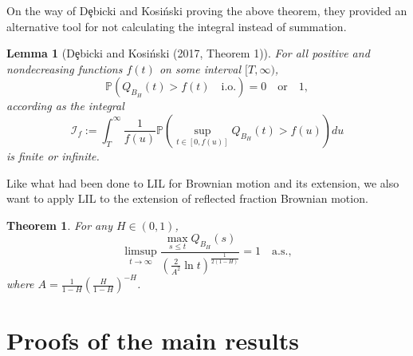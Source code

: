 \documentclass{article}
\newtheorem{thm}{\sc Theorem}
\newtheorem{lemma}{\sc Lemma}
\begin{document}
\begin{CJK*}{UTF8}{bsmi}
On the way of D{\c e}bicki and Kosi{\'n}ski proving the above theorem, they provided an alternative tool for not calculating the integral instead of summation.
\begin{lemma}[D{\c e}bicki and Kosi{\'n}ski (2017, Theorem 1)]
\label{integral}
For all positive and nondecreasing functions $f(t)$ on some interval $[T,\infty)$,
$$\mathbb{P}(Q_{B_{H}}(t)>f(t)\quad\mathrm{i.o.})=0\quad\mathrm{or}\quad1,$$
according as the integral
$$\mathcal{I}_f:=\int_T^\infty\frac{1}{f(u)}\mathbb{P}\left(\sup\limits_{t\in[0,f(u)]}Q_{B_{H}}(t)>f(u)\right)du$$
is finite or infinite.
\end{lemma}

Like what had been done to LIL for Brownian motion and its extension, we also want to apply LIL to the extension of reflected fraction Brownian motion.

\begin{thm}
\label{LIL_mrfbm}
    For any $H \in (0, 1)$,
    $$\limsup\limits_{t\rightarrow \infty} \frac{\max \limits_{s\leqslant t}Q_{B_{H}}(s)}{(\frac{2}{A^2}\ln{t})^{\frac{1}{2(1-H)}}} = 1 \quad \mathrm{a.s.},$$
    where $A = \frac{1}{1-H}(\frac{H}{1-H})^{-H}$.
\end{thm}

\newpage
\section{Proofs of the main results}

\newpage

\newpage

\newpage


\end{CJK*}
\end{document}
